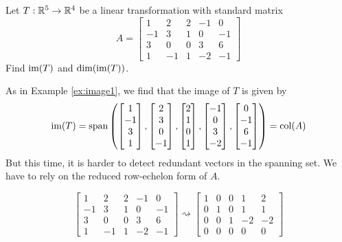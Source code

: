 \documentclass{ximera}
\begin{document}
\begin{example}\label{ex:image2}
Let $T:\mathbb{R}^5\rightarrow \mathbb{R}^4$ be a linear transformation with standard matrix $$A=\begin{bmatrix}1 & 2 & 2 &-1 & 0\\-1 & 3 & 1 & 0 & -1\\3 & 0 & 0 & 3 & 6\\ 1 & -1 & 1 & -2 & -1\end{bmatrix}$$
Find $\textnormal{im}(T)$ and $\textnormal{dim}(\textnormal{im}(T))$.
\begin{explanation}
As in Example \ref{ex:image1}, we find that the image of $T$ is given by
$$\textnormal{im}(T)=\textnormal{span}\left(\begin{bmatrix}1\\-1\\3\\1\end{bmatrix}, \begin{bmatrix}2\\3\\0\\-1\end{bmatrix}, \begin{bmatrix}2\\1\\0\\1\end{bmatrix}, \begin{bmatrix}-1\\0\\3\\-2\end{bmatrix}, \begin{bmatrix}0\\-1\\6\\-1\end{bmatrix}\right)=\textnormal{col}(A)$$
But this time, it is harder to detect redundant vectors in the spanning set.  We have to rely on the reduced row-echelon form of $A$.

$$\begin{bmatrix}1 & 2 & 2 &-1 & 0\\-1 & 3 & 1 & 0 & -1\\3 & 0 & 0 & 3 & 6\\ 1 & -1 & 1 & -2 & -1\end{bmatrix}  \rightsquigarrow \begin{bmatrix} 1 & 0 & 0 & 1 & 2\\0 & 1 & 0 & 1 & 1\\0 & 0 & 1 & -2 & -2\\ 0 & 0 & 0 & 0 & 0 \end{bmatrix}$$


\end{explanation}
\end{example}
\end{document}
